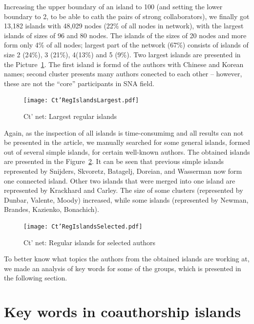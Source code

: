 \documentclass[11pt]{article} %
\begin{document}
Increasing the upper boundary of an island to 100 (and setting the lower boundary to 2, to be able to cath the pairs of strong collaborators), we finally got 13,182 islands with 48,029 nodes (22\% of all nodes in network), with the largest islands of sizes of 96 and 80 nodes. The islands of the sizes of 20 nodes and more form only 4\% of all nodes;  largest part of the network (67\%) consists of islands of size 2 (24\%), 3 (21\%), 4(13\%) and 5 (9\%). Two largest islands are presented in the Picture~\ref{CtRegIsl}. The first island is formd of the authors with Chinese and Korean names; second cluster presents many authors conected to each other -- however, these are not the ``core'' participants in SNA field. \medskip 

\begin{figure}
\begin{center}
\texttt{[image: Ct'RegIslandsLargest.pdf]}
\end{center}
\caption{Ct' net: Largest regular islands} \label{CtRegIsl}
\end{figure}

Again, as the inspection of all islands is time-consumimg and all results can not be presented in the article, we manually searched for some general islands, formed out of several simple islands, for certain well-known authors. The obtained islands are presented in the Figure~\ref{CtRegIslSel}. It can be seen that previous simple islands represented by Snijders, Skvoretz, Batagelj, Doreian, and Wasserman now form one connected island. Other two islands that were merged into one island are represented by Krackhard and Carley. The size of some clusters (represented by Dunbar, Valente, Moody) increased, while some islands (represented by Newman, Brandes, Kazienko, Bonachich). \medskip 

\begin{figure}
\begin{center}
\texttt{[image: Ct'RegIslandsSelected.pdf]}
\end{center}
\caption{Ct' net: Regular islands for selected authors} \label{CtRegIslSel}
\end{figure}

To better know what topics the authors from the obtained islands are working at, we made an analysis of key words for some of the groups, which is presented in the following section. \medskip


\section{Key words in coauthorship islands}
\end{document}
